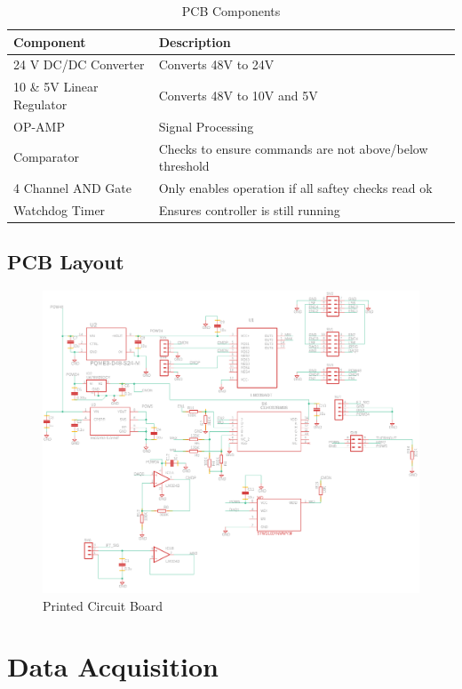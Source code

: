 \documentclass[12pt]{report}
\begin{document}
	\begin{table}[]
	\centering
	\caption{PCB Components}	
	\begin{tabular}{|l|l|}
		\hline
		\textbf{Component} & \textbf{Description}  \\ \hline
		24 V DC/DC Converter & Converts 48V to 24V  \\ \hline
		10 \& 5V Linear Regulator & Converts 48V to 10V and 5V  \\ \hline
		OP-AMP & Signal Processing   \\ \hline
		Comparator & Checks to ensure commands are not above/below threshold   \\ \hline
		4 Channel AND Gate & Only enables operation if all saftey checks read ok   \\ \hline
		Watchdog Timer & Ensures controller is still running \\ \hline

		\end{tabular}
	\label{tab:belt}
	\end{table}
		
		\subsection{PCB Layout}
		
	\begin{figure}[t] 
		\centering
		\includegraphics[width=0.9\linewidth]{pcb_schematic}
		\caption{Printed Circuit Board}
		\label{fig:pcb}
	\end{figure}
	
	\section{Data Acquisition} 
\end{document}
